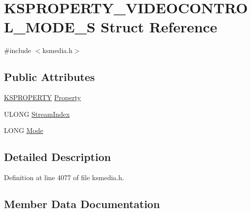 \hypertarget{struct_k_s_p_r_o_p_e_r_t_y___v_i_d_e_o_c_o_n_t_r_o_l___m_o_d_e___s}{}\section{K\+S\+P\+R\+O\+P\+E\+R\+T\+Y\+\_\+\+V\+I\+D\+E\+O\+C\+O\+N\+T\+R\+O\+L\+\_\+\+M\+O\+D\+E\+\_\+S Struct Reference}
\label{struct_k_s_p_r_o_p_e_r_t_y___v_i_d_e_o_c_o_n_t_r_o_l___m_o_d_e___s}


{\ttfamily \#include $<$ksmedia.\+h$>$}

\subsection*{Public Attributes}
\begin{DoxyCompactItemize}
\item 
\hyperlink{ks_8h_a4392f77c74e868d813d46c39ada4d660}{K\+S\+P\+R\+O\+P\+E\+R\+TY} \hyperlink{struct_k_s_p_r_o_p_e_r_t_y___v_i_d_e_o_c_o_n_t_r_o_l___m_o_d_e___s_a1875e7a7c84cebd31c16bb29938c0a12}{Property}
\item 
U\+L\+O\+NG \hyperlink{struct_k_s_p_r_o_p_e_r_t_y___v_i_d_e_o_c_o_n_t_r_o_l___m_o_d_e___s_a31ef3eb4903ab89bf29ddc99ddfdea72}{Stream\+Index}
\item 
L\+O\+NG \hyperlink{struct_k_s_p_r_o_p_e_r_t_y___v_i_d_e_o_c_o_n_t_r_o_l___m_o_d_e___s_aad4f5574326262693e107ff017196c64}{Mode}
\end{DoxyCompactItemize}


\subsection{Detailed Description}


Definition at line 4077 of file ksmedia.\+h.



\subsection{Member Data Documentation}
